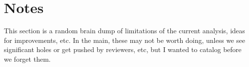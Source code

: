 \documentclass{article}\usepackage[]{graphicx}\usepackage[]{color}
\begin{document}

\section{Notes}

This section is a random brain dump of limitations of the current analysis, ideas for improvements, etc.  In the main,
these may not be worth doing, unless we see significant holes or get pushed by reviewers, etc, but I wanted to catalog
before we forget them.
\end{document}
